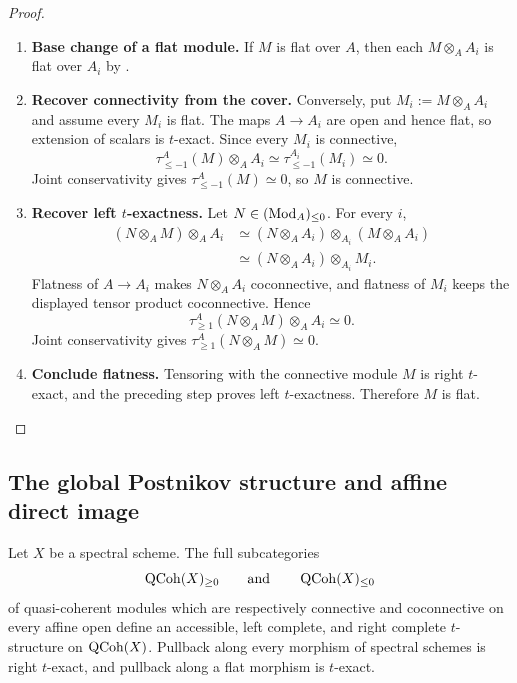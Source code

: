 \begin{proof}
\leavevmode
\begin{enumerate}[label=\textup{(\arabic*)}]
    \item \textbf{Base change of a flat module.}
    If \(M\) is flat over \(A\), then each
    \(M\otimes_AA_i\) is flat over \(A_i\) by
    .

    \item \textbf{Recover connectivity from the cover.}
    Conversely, put \(M_i:=M\otimes_AA_i\) and assume every \(M_i\) is flat.
    The maps \(A\to A_i\) are open and hence flat, so extension of scalars is
    \(t\)-exact. Since every \(M_i\) is connective,
    \[
        \tau_{\leq-1}^{A}(M)\otimes_AA_i
        \simeq
        \tau_{\leq-1}^{A_i}(M_i)
        \simeq0.
    \]
    Joint conservativity gives \(\tau_{\leq-1}^{A}(M)\simeq0\), so \(M\) is
    connective.

    \item \textbf{Recover left $t$-exactness.}
    Let \(N\in(\operatorname{Mod}_{A})_{\leq0}\). For every \(i\),
    \[
    \begin{aligned}
        (N\otimes_AM)\otimes_AA_i
        &\simeq
        (N\otimes_AA_i)\otimes_{A_i}(M\otimes_AA_i)
        \\
        &\simeq
        (N\otimes_AA_i)\otimes_{A_i}M_i.
    \end{aligned}
    \]
    Flatness of \(A\to A_i\) makes \(N\otimes_AA_i\) coconnective, and
    flatness of \(M_i\) keeps the displayed tensor product coconnective.
    Hence
    \[
        \tau_{\geq1}^{A}(N\otimes_AM)\otimes_AA_i\simeq0.
    \]
    Joint conservativity gives
    \(\tau_{\geq1}^{A}(N\otimes_AM)\simeq0\).

    \item \textbf{Conclude flatness.}
    Tensoring with the connective module \(M\) is right \(t\)-exact, and the
    preceding step proves left \(t\)-exactness. Therefore \(M\) is flat.
\end{enumerate}
\end{proof}

\subsection{The global Postnikov structure and affine direct image}

\begin{theorem}
\label{thm:qcoh-spectral-scheme-t-structure}
Let \(X\) be a spectral scheme. The full subcategories
\[
    \operatorname{QCoh}(X)_{\geq0}
    \qquad\text{and}\qquad
    \operatorname{QCoh}(X)_{\leq0}
\]
of quasi-coherent modules which are respectively connective and coconnective
on every affine open define an accessible, left complete, and right complete
\(t\)-structure on \(\operatorname{QCoh}(X)\). Pullback along every morphism of spectral
schemes is right \(t\)-exact, and pullback along a flat morphism is
\(t\)-exact.
\end{theorem}

